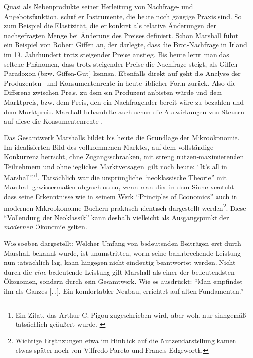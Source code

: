 Quasi als Nebenprodukte seiner Herleitung von Nachfrage- und Angebotsfunktion, schuf er Instrumente, die heute noch gängige Praxis sind. So zum Beispiel die Elastizität, die er konkret als relative Änderungen der nachgefragten Menge bei Änderung des Preises definiert. Schon Marshall führt ein Beispiel von Robert Giffen an, der darlegte, dass die Brot-Nachfrage in Irland im 19. Jahrhundert trotz steigender Preise anstieg. Bis heute lernt man das seltene Phänomen, dass trotz steigender Preise die Nachfrage steigt, als Giffen-Paradoxon (bzw. Giffen-Gut) kennen. Ebenfalls direkt auf \textcite{Marshall1890} geht die Analyse der Produzenten- und Konsumentenrente in heute üblicher Form zurück. Also die Differenz zwischen Preis, zu dem ein Produzent anbieten würde und dem Marktpreis, bzw. dem Preis, den ein Nachfragender bereit wäre zu bezahlen und dem Marktpreis. Marshall behandelte auch schon die Auswirkungen von Steuern auf diese die Konsumentenrente \parencite[S. 351]{Rosner2012}. 

Das Gesamtwerk Marshalls bildet bis heute die Grundlage der Mikroökonomie. Im idealisierten Bild des vollkommenen Marktes, auf dem vollständige Konkurrenz herrscht, ohne Zugangsschranken, mit streng nutzen-maximierenden Teilnehmern und ohne jegliches Marktversagen, gilt noch heute: "`It's all in Marshall!"'\footnote{Ein Zitat, das Arthur C. Pigou zugeschrieben wird, aber wohl nur sinngemäß tatsächlich geäußert wurde. \parencite{Audretsch2007, Pigou1925}}. Tatsächlich war die ursprüngliche "`neoklassische Theorie"' mit Marshall gewissermaßen abgeschlossen, wenn man dies in dem Sinne versteht, dass seine Erkenntnisse wie in seinem Werk "`Principles of Economics"' auch in modernen Mikroökonomie Büchern praktisch identisch dargestellt werden\footnote{Wichtige Ergänzungen etwa im Hinblick auf die Nutzendarstellung kamen etwas später noch von Vilfredo Pareto und Francis Edgeworth.}. Diese "`Vollendung der Neoklassik"' kann deshalb vielleicht als Ausgangspunkt der \textit{modernen} Ökonomie gelten.

Wie soeben dargestellt: Welcher Umfang von bedeutenden Beiträgen erst durch Marshall bekannt wurde, ist unumstritten, worin seine bahnbrechende Leistung nun tatsächlich lag, kann hingegen nicht eindeutig beantwortet werden. Nicht durch die \textit{eine} bedeutende Leistung gilt Marshall als einer der bedeutendsten Ökonomen, sondern durch sein Gesamtwerk. Wie \textcite{Rieter1989} es ausdrückt: "`Man empfindet ihn als Ganzes [...]. Ein komfortabler Neubau, errichtet auf alten Fundamenten."' 

